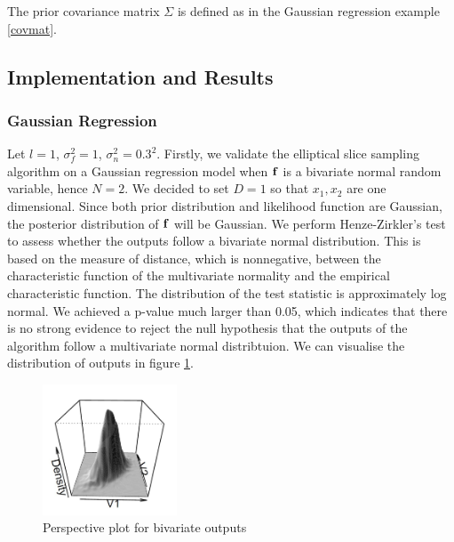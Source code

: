 \documentclass{article}
\begin{document}
The prior covariance matrix $\Sigma$ is defined as in the Gaussian regression example \ref{covmat}.

\subsection{Implementation and Results}
\subsubsection{Gaussian Regression}

Let $l=1$, $\sigma_{f}^2 = 1$, $\sigma_{n}^2 = 0.3^2$. Firstly, we validate the elliptical slice sampling algorithm on a Gaussian regression model when $\bf{f}$ is a bivariate normal random variable, hence $N = 2$. We decided to set $D = 1$ so that $x_1,x_2$ are one dimensional. Since both prior distribution and likelihood function are Gaussian, the posterior distribution of $\bf{f}$ will be Gaussian. We perform Henze-Zirkler's test to assess whether the outputs follow a bivariate normal distribution. This is based on the measure of distance, which is nonnegative, between the characteristic function of the multivariate normality and the empirical characteristic function. The distribution of the test statistic is approximately log normal. We achieved a p-value much larger than 0.05, which indicates that there is no strong evidence to reject the null hypothesis that the outputs of the algorithm follow a multivariate normal distribtuion. We can visualise the distribution of outputs in figure \ref{fig1}.

\begin{figure} [h!]\label{fig1}
\centering
\includegraphics[width=4cm]{3dplot.JPG}
\caption{Perspective plot for bivariate outputs}
\end{figure}
\end{document}
